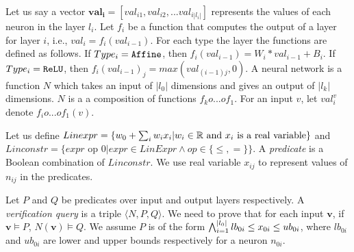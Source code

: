 

Let us say a vector $\boldsymbol{val_i} = [val_{i1}, val_{i2}, ... val_{i|l_i|}]$ represents the values
of each neuron 
in the layer $l_i$.
Let $f_i$ be a function that computes the output of a layer for layer $i$,
i.e., $val_i = f_i(val_{i-1})$.
For each type the layer the functions are defined as follows.
If $Type_i = \mathtt{Affine}$, then $f_{i}(val_{i-1}) = W_i * val_{i-1} + B_i$.
If $Type_i = \mathtt{ReLU}$, then $f_{i}(val_{i-1})_j =  max(val_{{(i-1)}j},0)$.
%
A neural network is a function $N$ which takes an input of $|l_0|$ dimensions and gives an 
output of $|l_k|$ dimensions. $N$ is a a composition of functions $f_k o ... o f_1$.
For an input $v$, let $val^v_{i}$ denote $f_i o ... o f_1(v)$.

Let us define 
$Linexpr = \{ w_0 + \sum_{i} w_i x_i | w_i \in \mathbb{R} \text{ and } x_i \text{ is a real variable} \}$
and
$Linconstr = \{expr \text{ op } 0 | expr \in LinExpr \land op \in \{\leq, = \}\}$.
A {\em predicate} is a Boolean combination of $Linconstr$.
We use real variable $x_{ij}$ to represent values of $n_{ij}$ in the predicates.

Let $P$ and $Q$ be predicates over input and output layers respectively.
A {\em verification query} is a triple $\langle N, P, Q \rangle$.
We need to prove that for each input $\boldsymbol{v}$,
if $\boldsymbol{v} \models P$, $N(\boldsymbol{v}) \models Q$.
We assume $P$ is of the form
$\bigwedge_{i=1}^{|l_0|}lb_{0i} \leq x_{0i} \leq ub_{0i}$, where $lb_{0i}$ and $ub_{0i}$ are lower and upper bounds respectively for a neuron $n_{0i}$.






